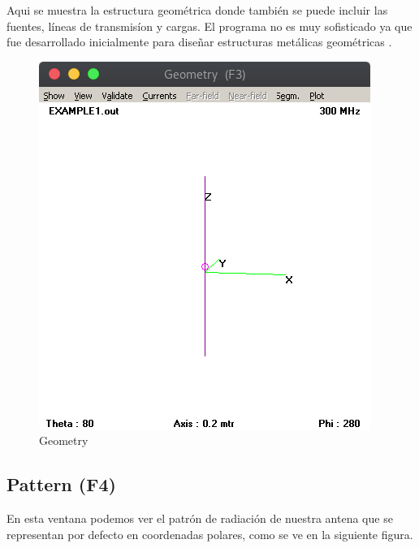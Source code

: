 \documentclass[11pt,a4paper]{article}
\begin{document}
Aqui se muestra la estructura geométrica donde también se puede incluir las fuentes, l\'ineas de transmisíon y cargas. El programa no es muy sofisticado ya que fue desarrollado inicialmente para diseñar estructuras met\'alicas geom\'etricas \cite{ant} .

\begin{figure}[H]
    \centering
    \includegraphics[scale=0.45]{images/Interfaz/geometry.png}
    \caption{Geometry}
    \label{fig2:Geometry}
\end{figure}

\subsection{Pattern (F4)}\label{sec:2.3}

En esta ventana podemos ver el patr\'on de radiaci\'on de nuestra antena que se representan por defecto en coordenadas polares, como se ve en la siguiente figura.
\end{document}

